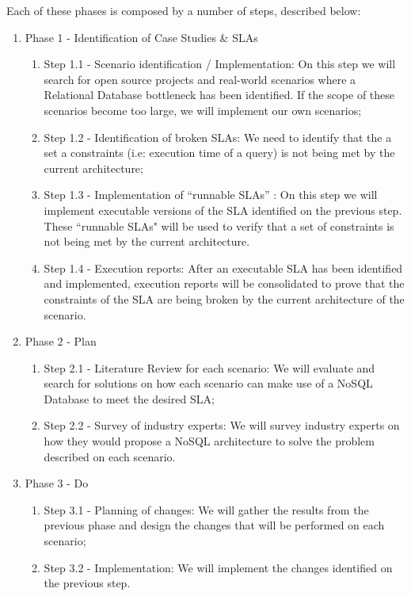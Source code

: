 Each of these phases is composed by a number of steps, described below:
\begin{enumerate}
\item{Phase 1 - Identification of Case Studies \& SLAs }
   \begin{enumerate}
   \item {Step 1.1 - Scenario identification / Implementation: On this step we will search for open source projects and real-world scenarios where a Relational Database bottleneck has been identified. If the scope of these scenarios become too large, we will implement our own scenarios; }
   \item {Step 1.2 - Identification of broken SLAs: We need to identify that the a set a constraints (i.e: execution time of a query) is not being met by the current architecture;}
   \item {Step 1.3 - Implementation of ``runnable SLAs'' : On this step we will implement executable versions of the SLA identified on the previous step. These ``runnable SLAs" will be used to verify that a set of constraints is not being met by the current architecture. }
   \item {Step 1.4 - Execution reports: After an executable SLA has been identified and implemented, execution reports will be consolidated to prove that the constraints of the SLA are being broken by the current architecture of the scenario.}

   \end{enumerate}


\item{Phase 2 - Plan}
   \begin{enumerate}
   \item{Step 2.1 - Literature Review for each scenario: We will evaluate and search for solutions on how each scenario can make use of a NoSQL Database to meet the desired SLA; }
   \item{Step 2.2 - Survey of industry experts: We will survey industry experts on how they would propose a NoSQL architecture to solve the problem described on each scenario. }
   \end{enumerate}

\item{Phase 3 - Do}
   \begin{enumerate}
   \item{Step 3.1 - Planning of changes: We will gather the results from the previous phase and design the changes that will be performed on each scenario;}
   \item{Step 3.2 - Implementation: We will implement the changes identified on the previous step. }
   \end{enumerate}


\end{enumerate}
